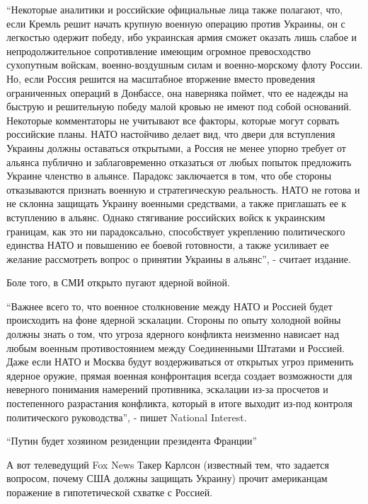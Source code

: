 \begin{multicols}{3}
\enquote{Некоторые аналитики и российские официальные лица также полагают, что, если
Кремль решит начать крупную военную операцию против Украины, он с легкостью
одержит победу, ибо украинская армия сможет оказать лишь слабое и
непродолжительное сопротивление имеющим огромное превосходство сухопутным
войскам, военно-воздушным силам и военно-морскому флоту России. Но, если Россия
решится на масштабное вторжение вместо проведения ограниченных операций в
Донбассе, она наверняка поймет, что ее надежды на быструю и решительную победу
малой кровью не имеют под собой оснований. Некоторые комментаторы не учитывают
все факторы, которые могут сорвать российские планы. НАТО настойчиво делает
вид, что двери для вступления Украины должны оставаться открытыми, а Россия не
менее упорно требует от альянса публично и заблаговременно отказаться от любых
попыток предложить Украине членство в альянсе. Парадокс заключается в том, что
обе стороны отказываются признать военную и стратегическую реальность. НАТО не
готова и не склонна защищать Украину военными средствами, а также приглашать ее
к вступлению в альянс. Однако стягивание российских войск к украинским
границам, как это ни парадоксально, способствует укреплению политического
единства НАТО и повышению ее боевой готовности, а также усиливает ее желание
рассмотреть вопрос о принятии Украины в альянс}, - считает издание.


Боле того, в СМИ открыто пугают ядерной войной.

\enquote{Важнее всего то, что военное столкновение между НАТО и Россией будет
происходить на фоне ядерной эскалации. Стороны по опыту холодной войны должны
знать о том, что угроза ядерного конфликта неизменно нависает над любым военным
противостоянием между Соединенными Штатами и Россией. Даже если НАТО и Москва
будут воздерживаться от открытых угроз применить ядерное оружие, прямая военная
конфронтация всегда создает возможности для неверного понимания намерений
противника, эскалации из-за просчетов и постепенного разрастания конфликта,
который в итоге выходит из-под контроля политического руководства}, - пишет
National Interest. 

\enquote{Путин будет хозяином резиденции президента Франции} 

А вот телеведущий Fox News Такер Карлсон (известный тем, что задается вопросом,
почему США должны защищать Украину) прочит американцам поражение в
гипотетической схватке с Россией.


\end{multicols}
